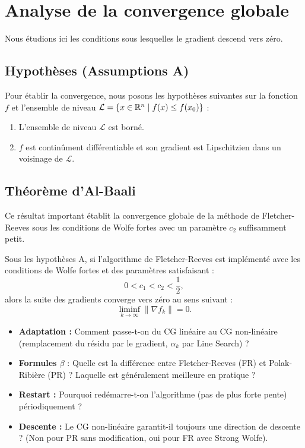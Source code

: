 \section{Analyse de la convergence globale}

Nous étudions ici les conditions sous lesquelles le gradient descend vers zéro.

\subsection{Hypothèses (Assumptions A)}
Pour établir la convergence, nous posons les hypothèses suivantes sur la fonction $f$ et l'ensemble de niveau $\mathcal{L} = \{x \in \mathbb{R}^n \mid f(x) \le f(x_0)\}$ :
\begin{enumerate}
    \item L'ensemble de niveau $\mathcal{L}$ est borné.
    \item $f$ est continûment différentiable et son gradient est Lipschitzien dans un voisinage de $\mathcal{L}$.
\end{enumerate}

\subsection{Théorème d'Al-Baali}

Ce résultat important établit la convergence globale de la méthode de Fletcher-Reeves sous les conditions de Wolfe fortes avec un paramètre $c_2$ suffisamment petit.

\begin{theoreme}[Al-Baali]
Sous les hypothèses A, si l'algorithme de Fletcher-Reeves est implémenté avec les conditions de Wolfe fortes et des paramètres satisfaisant :
\[
0 < c_1 < c_2 < \frac{1}{2},
\]
alors la suite des gradients converge vers zéro au sens suivant :
\[
\liminf_{k \to \infty} \|\nabla f_k\| = 0.
\]
\end{theoreme}

\bigskip
\begin{checkpoint}
\begin{itemize}
    \item \textbf{Adaptation :} Comment passe-t-on du CG linéaire au CG non-linéaire (remplacement du résidu par le gradient, $\alpha_k$ par Line Search) ?
    \item \textbf{Formules $\beta$} : Quelle est la différence entre Fletcher-Reeves (FR) et Polak-Ribière (PR) ? Laquelle est généralement meilleure en pratique ?
    \item \textbf{Restart :} Pourquoi redémarre-t-on l'algorithme (pas de plus forte pente) périodiquement ?
    \item \textbf{Descente :} Le CG non-linéaire garantit-il toujours une direction de descente ? (Non pour PR sans modification, oui pour FR avec Strong Wolfe).
\end{itemize}
\end{checkpoint}
